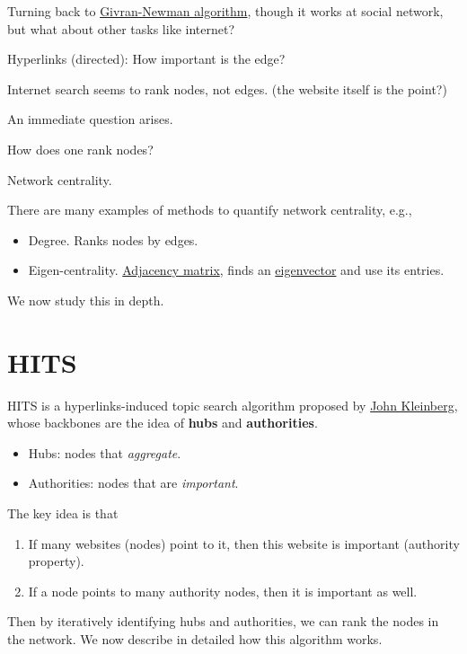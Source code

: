 \begin{prev}
	Turning back to \hyperref[algo:Girvan-Newman-algorithm]{Givran-Newman algorithm}, though it works at social network, but what about other tasks like
	internet?
	\begin{problem}
	Hyperlinks (directed): How important is the edge?
	\end{problem}
	\begin{answer}
		Internet search seems to rank nodes, not edges. (the website itself is the point?)
	\end{answer}

	An immediate question arises.

	\begin{problem}
	How does one rank nodes?
	\end{problem}
	\begin{answer}
		Network centrality.
	\end{answer}
\end{prev}
\begin{eg}
	There are many examples of methods to quantify network centrality, e.g.,
	\begin{itemize}
		\item Degree. Ranks nodes by edges.
		\item Eigen-centrality. \hyperref[def:adjacency-matrix]{Adjacency matrix}, finds an \hyperref[def:eigenvector]{eigenvector} and use its entries.
	\end{itemize}
\end{eg}

We now study this in depth.

\chapter{HITS}
HITS is a hyperlinks-induced topic search algorithm proposed by \href{https://en.wikipedia.org/wiki/Jon_Kleinberg}{John Kleinberg}, whose backbones are the
idea of \textbf{hubs} and \textbf{authorities}.
\begin{itemize}
	\item Hubs: nodes that \emph{aggregate}.
	\item Authorities: nodes that are \emph{important}.
\end{itemize}

The key idea is that
\begin{enumerate}
	\item If many websites (nodes) point to it, then this website is important (authority property).
	\item If a node points to many authority nodes, then it is important as well.
\end{enumerate}
Then by iteratively identifying hubs and authorities, we can rank the nodes in the network. We now describe in detailed how this algorithm works.

